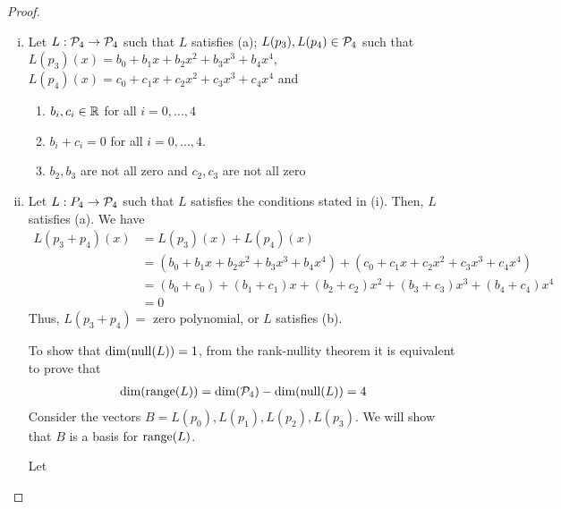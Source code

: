 \begin{proof}
    \renewcommand{\qedsymbol}{$\blacksquare$}
    \begin{enumerate}[(i)]
        \item Let $L:\P_4\rightarrow\P_4$ such that $L$ satisfies (a); $L(p_3), L(p_4)\in\P_4$ such that $L(p_3)(x)=b_0+b_1x+b_2x^2+b_3x^3+b_4x^4$, $L(p_4)(x)=c_0+c_1x+c_2x^2+c_3x^3+c_4x^4$ and
        \begin{enumerate}[(1)]
            \item $b_i,c_i\in\R$ for all $i=0,...,4$
            \item $b_i+c_i=0$ for all $i=0,...,4$.
            \item $b_2,b_3$ are not all zero and $c_2,c_3$ are not all zero
        \end{enumerate}
        \item Let $L:P_4\rightarrow\P_4$ such that $L$ satisfies the conditions stated in (i). Then, $L$ satisfies (a).
        We have 
        \[
            \begin{aligned}
                L(p_3+p_4)(x) &= L(p_3)(x)+L(p_4)(x)\\
                &= (b_0+b_1x+b_2x^2+b_3x^3+b_4x^4)+(c_0+c_1x+c_2x^2+c_3x^3+c_4x^4)\\
                &= (b_0+c_0)+(b_1+c_1)x+(b_2+c_2)x^2+(b_3+c_3)x^3+(b_4+c_4)x^4\\
                &= 0
            \end{aligned}
        \]
        Thus, $L(p_3+p_4)=$ zero polynomial, or $L$ satisfies (b).
        
        To show that $\dim(\nullla(L))=1$, from the rank-nullity theorem it is equivalent to prove that 
        \[
            \begin{aligned}
                \dim(\range(L))=\dim(\P_4)-\dim(\nullla(L))=4
            \end{aligned}
        \]
        Consider the vectors $B=L(p_0),L(p_1),L(p_2),L(p_3)$. We will show that $B$ is a basis for $\range(L)$.

        Let 
    \end{enumerate}
\end{proof}